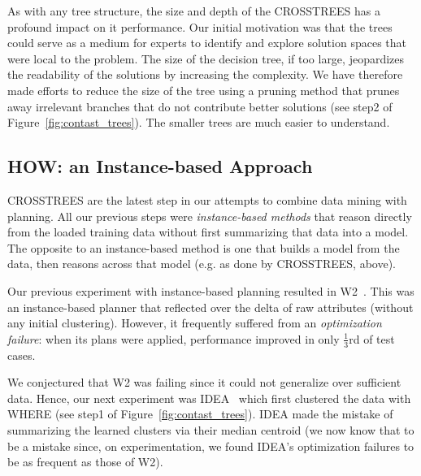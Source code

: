 \documentclass[conference]{IEEEtran}
\newcommand{\fig}[1]{Figure~\ref{fig:#1}}
\begin{document}
 
 
	

As with any tree structure, the size and depth of the CROSSTREES has a profound impact on it performance. Our initial motivation was that the trees could serve as a medium for experts to identify and explore solution spaces that were local to the problem. The size of the decision tree, if too large, jeopardizes the readability of the solutions by increasing the complexity. We have therefore made efforts to reduce the size of the tree using  a pruning method that prunes away irrelevant branches that do not contribute better solutions (see step2 of \fig{contast_trees}). The smaller trees are much easier to understand.



	\subsection{HOW: an Instance-based Approach}
	CROSSTREES are the latest step in our attempts to combine data mining
	with planning.   All our previous steps were {\em instance-based methods}
that   reason directly
	from the loaded training data without first summarizing that data into a model.
	The opposite to an instance-based method is one that builds
	a model from the data, then reasons across that model (e.g. as done by
	CROSSTREES, above). 
	
	Our previous experiment with instance-based planning
	resulted in  W2~\cite{6600685}. This was an instance-based planner that reflected over the delta of raw attributes  (without any initial clustering). However, it frequently suffered from an {\em optimization failure}: when its plans were applied, performance improved in only $\tfrac{1}{3}$rd of test cases. 

	We conjectured that W2 was failing since it could not generalize over sufficient
	data. Hence, our next experiment was IDEA~\cite{me12c} which first clustered the data with WHERE (see step1 of  \fig{contast_trees}). IDEA made the mistake of summarizing the learned clusters via their median centroid (we now know that to be a mistake since, on experimentation, we found
	IDEA's optimization failures to be as frequent as those of W2).
 
\end{document}
